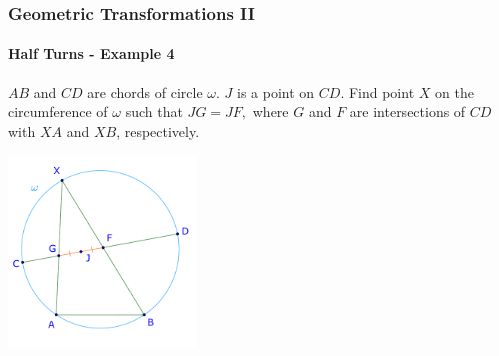 \documentclass[8pt,xcolor=table,dvipsnames]{beamer}
\begin{document}
\begin{frame}[t]
    \frametitle{Geometric Transformations II}
    \framesubtitle{Half Turns - Example 4}
    \begin{example}
        $AB$ and $CD$ are chords of circle $\omega$. $J$ is a point on $CD$. Find point $X$ on the circumference of $\omega$ such that $JG = JF,$
        where $G$ and $F$ are intersections of $CD$ with $XA$ and $XB$, respectively.
    \end{example}

    \begin{center}
        \includegraphics[width=5cm]{./svg/pdf/rotation-3a.pdf}
    \end{center}
\end{frame}
\end{document}
